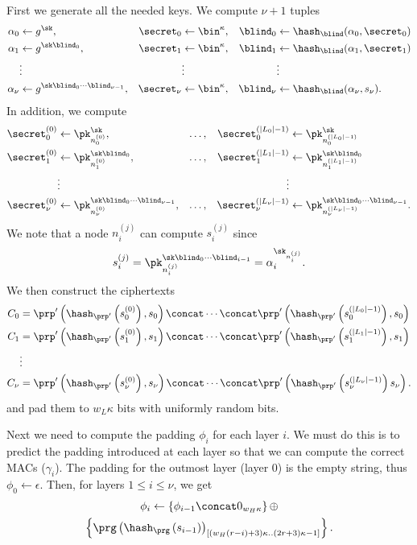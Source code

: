 First we generate all the needed keys.
We compute \(\nu+1\) tuples
\begin{align*}
  \alpha_0 &\gets g^\sk,
  & \secret_0 &\gets \bin^\kappa,
  & \blind_0 &\gets \hash_\blind(\alpha_0, \secret_0) \\
  \alpha_1 &\gets g^{\sk\blind_0},
  & \secret_1 &\gets \bin^\kappa,
  & \blind_1 &\gets \hash_\blind(\alpha_1, \secret_1) \\
  &\vdots &&\vdots && \vdots \\
  \alpha_\nu &\gets g^{\sk \blind_0\dotsb \blind_{\nu-1}},
  & \secret_\nu &\gets \bin^\kappa,
  & \blind_\nu &\gets \hash_\blind(\alpha_\nu, s_\nu).
\end{align*}
In addition, we compute
\begin{align*}
  \secret_0^{(0)} &\gets \pk_{n_0^{(0)}}^\sk,
  & \dotsc, &
  & \secret_0^{(|L_0|-1)} &\gets \pk_{n_0^{(|L_0|-1)}}^\sk \\
  \secret_1^{(0)} &\gets \pk_{n_1^{(0)}}^{\sk \blind_0},
  & \dotsc, &
  & \secret_1^{(|L_1|-1)} &\gets \pk_{n_1^{(|L_1|-1)}}^{\sk \blind_0} \\
  & \vdots &&& \vdots \\
  \secret_\nu^{(0)} &\gets \pk_{n_\nu^{(0)}}^{\sk \blind_0\dotsb 
    \blind_{\nu-1}},
  & \dotsc, &
  & \secret_\nu^{(|L_\nu|-1)} &\gets \pk_{n_\nu^{(|L_\nu|-1)}}^{\sk 
    \blind_0\dotsb \blind_{\nu-1}}.
\end{align*}
We note that a node \(n_i^{(j)}\) can compute \(s_i^{(j)}\) since \[
  s_i^{(j)} = \pk_{n_i^{(j)}}^{\sk \blind_0\dotsb \blind_{i-1}} = 
  \alpha_i^{\sk_{n_i^{(j)}}}.
\]
We then construct the ciphertexts
\begin{align*}
  C_0 &= \prp'\left(\hash_{\prp'}\left(s_0^{(0)}\right), s_0\right)
  \concat \dotsb
  \concat \prp'\left(\hash_{\prp'}\left(s_0^{(|L_0|-1)}\right), s_0\right) \\
  C_1 &= \prp'\left(\hash_{\prp'}\left(s_1^{(0)}\right), s_1\right)
  \concat \dotsb
  \concat \prp'\left(\hash_{\prp'}\left(s_1^{(|L_1|-1)}\right), s_1\right) \\
  & \vdots \\
  C_\nu &= \prp'\left(\hash_{\prp'}\left(s_\nu^{(0)}\right), s_\nu\right)
  \concat \dotsb
  \concat \prp'\left(\hash_{\prp'}\left(s_\nu^{(|L_\nu|-1)}\right) 
    s_\nu\right).
\end{align*}
and pad them to \(w_L\kappa\) bits with uniformly random bits.

Next we need to compute the padding \(\phi_i\) for each layer \(i\).
We must do this is to predict the padding introduced at each layer so that we 
can compute the correct \acp{MAC} (\(\gamma_i\)).
The padding for the outmost layer (layer 0) is the empty string, thus \(\phi_0 
  \gets \epsilon\).
Then, for layers \(1\leq i\leq \nu\), we get
\begin{multline*}
  \phi_i\gets \left\{\phi_{i-1}\concat 0_{w_H\kappa}\right\}\oplus \\
  \left\{\prg\left(\hash_\prg\left(s_{i-1}\right)\right)_{[(w_H(r-i)+3)\kappa..(2r+3)\kappa-1]}\right\}.
\end{multline*}

